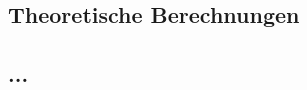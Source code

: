 \documentclass[a4paper,10pt]{article}
\newcommand{\rem}[1]{}
\begin{document}
\rem{

\subsection{Formelpool}
\subsubsection{Ohne Frequenzverschiebung}

\begin{equation}
 \nu' = \frac{1}{\sqrt{1-\frac{v^2}{c^2}}}(1-\frac{v}{c})\nu
\end{equation}

\begin{equation}
 \nu'' = \frac{1}{\sqrt{1-\frac{v^2}{c^2}}}(1-\frac{v}{c})\nu'
\end{equation}

\begin{equation}
 \frac{\nu''-\nu}{\nu} = -2\frac{v/c}{1+v/c} \approx -2 \frac{v}{c}
\end{equation}

\subsubsection{mit Frequenzverschiebung}
\begin{equation}
\nu^{*} = \nu\frac{240}{211}
\end{equation}

\begin{equation}
 \nu'_E = \frac{1}{\sqrt{1-\frac{v^2}{c^2}}}(1-\frac{v}{c}) \cdot \frac{240}{211}\nu_R \, = \, \frac{1}{1-\frac{v^2}{c^2}}(1-\frac{v}{c})^2 \cdot \frac{240}{211} \nu_E
\end{equation}

\begin{equation}
 \frac{\nu'_E-\nu_E}{\nu_E} = \frac{\frac{19}{221}- \frac{461}{221}\frac{v}{c}}{1+\frac{v}{c}}
\end{equation}

}

\subsection{Theoretische Berechnungen}
\subsection{...}
\end{document}
